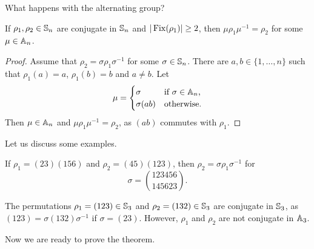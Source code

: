 What happens with the alternating group? 

\begin{lemma}
If $\rho_1,\rho_2\in\mathbb{S}_n$ are conjugate in $\mathbb{S}_n$ and  $|\operatorname{Fix}(\rho_1)|\geq2$, then 
$\mu\rho_1\mu^{-1}=\rho_2$ for some $\mu\in\mathbb{A}_n$.  
\end{lemma}

\begin{proof}
Assume that $\rho_2=\sigma\rho_1\sigma^{-1}$ for some $\sigma\in\mathbb{S}_n$. 
There are $a,b\in\{1,\dots,n\}$ such that
$\rho_1(a)=a$, $\rho_1(b)=b$ and $a\ne b$. Let 
\[
\mu=\begin{cases}
\sigma & \text{if $\sigma\in\mathbb{A}_n$,}\\
\sigma(ab) & \text{otherwise.}
\end{cases}
\]
Then $\mu\in\mathbb{A}_n$ and $\mu\rho_1\mu^{-1}=\rho_2$, as 
$(ab)$ commutes with $\rho_1$. 
\end{proof}

Let us discuss some examples.

\begin{example}
If $\rho_1=(23)(156)$ and $\rho_2=(45)(123)$, then 
$\rho_2=\sigma\rho_1\sigma^{-1}$ for  
\[
\sigma=\binom{123456}{145623}.
\]
\end{example}

\begin{example}
The permutations $\rho_1=(123)\in\mathbb{S}_3$ and $\rho_2=(132)\in\mathbb{S}_3$ are conjugate 
in $\mathbb{S}_3$, as  
$(123)=\sigma(132)\sigma^{-1}$ if $\sigma=(23)$. However, $\rho_1$ and $\rho_2$ are not conjugate in $\mathbb{A}_3$. 
\end{example}

Now we are ready to prove the theorem. 


